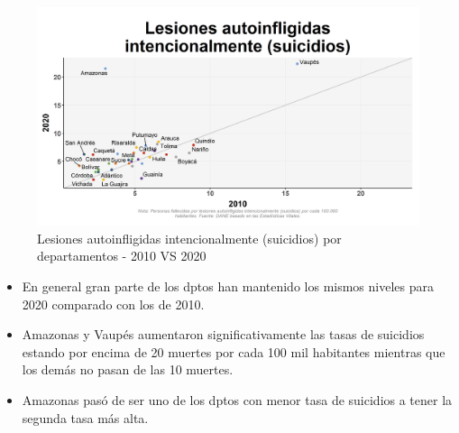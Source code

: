     \begin{figure}[H]
        \caption{Lesiones autoinfligidas intencionalmente (suicidios) por departamentos - 2010 VS 2020 \label{map_result_2} }
        \begin{center}
        \includegraphics[width=\textwidth,keepaspectratio]{img/var_294_scatter_time.png}
        \end{center}
    \end{figure}
            \begin{itemize}
                \item En general gran parte de los dptos han mantenido los mismos niveles para 2020 comparado con los de 2010.
                \item Amazonas y Vaupés aumentaron significativamente las tasas de suicidios estando por encima de 20 muertes por cada 100 mil habitantes mientras que los demás no pasan de las 10 muertes.
                \item Amazonas pasó de ser uno de los dptos con menor tasa de suicidios a tener la segunda tasa más alta.
                \end{itemize}

